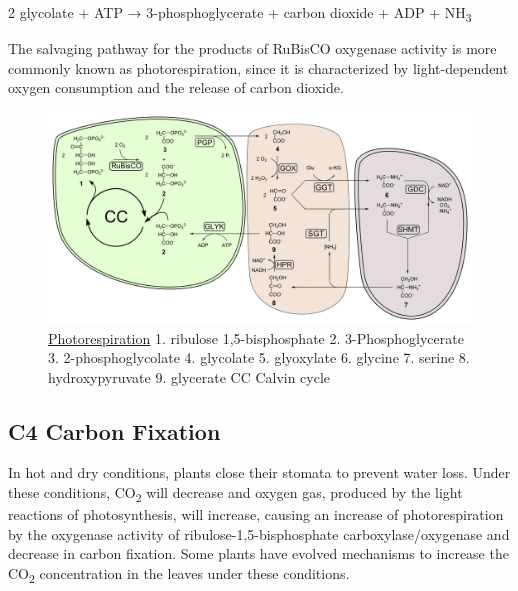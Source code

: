 2 glycolate + ATP → 3-phosphoglycerate + carbon dioxide + ADP + NH\textsubscript{3}

The salvaging pathway for the products of RuBisCO oxygenase activity is more commonly known as photorespiration, since it is characterized by light-dependent oxygen consumption and the release of carbon dioxide.



\begin{figure}

{\centering \includegraphics[width=0.7\linewidth]{./figures/photosynthesis/Photorespiration} 

}

\caption{\href{https://commons.wikimedia.org/wiki/File:Photorespiration.svg}{Photorespiration} 1. ribulose 1,5-bisphosphate 2. 3-Phosphoglycerate 3. 2-phosphoglycolate 4. glycolate 5. glyoxylate 6. glycine 7. serine 8. hydroxypyruvate 9. glycerate CC Calvin cycle}\label{fig:photorespiration}
\end{figure}

\hypertarget{c4-carbon-fixation}{%
\subsection{C4 Carbon Fixation}\label{c4-carbon-fixation}}

In hot and dry conditions, plants close their stomata to prevent water loss. Under these conditions, CO\textsubscript{2} will decrease and oxygen gas, produced by the light reactions of photosynthesis, will increase, causing an increase of photorespiration by the oxygenase activity of ribulose-1,5-bisphosphate carboxylase/oxygenase and decrease in carbon fixation. Some plants have evolved mechanisms to increase the CO\textsubscript{2} concentration in the leaves under these conditions.



